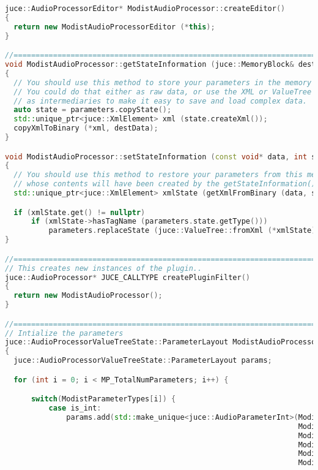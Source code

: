 \documentclass{article}
\begin{document}
\begin{appendix}
\begin{lstlisting}[language=C++]
juce::AudioProcessorEditor* ModistAudioProcessor::createEditor()
{
  return new ModistAudioProcessorEditor (*this);
}

//==============================================================================
void ModistAudioProcessor::getStateInformation (juce::MemoryBlock& destData)
{
  // You should use this method to store your parameters in the memory block.
  // You could do that either as raw data, or use the XML or ValueTree classes
  // as intermediaries to make it easy to save and load complex data.
  auto state = parameters.copyState();
  std::unique_ptr<juce::XmlElement> xml (state.createXml());
  copyXmlToBinary (*xml, destData);
}

void ModistAudioProcessor::setStateInformation (const void* data, int sizeInBytes)
{
  // You should use this method to restore your parameters from this memory block,
  // whose contents will have been created by the getStateInformation() call.
  std::unique_ptr<juce::XmlElement> xmlState (getXmlFromBinary (data, sizeInBytes));

  if (xmlState.get() != nullptr)
      if (xmlState->hasTagName (parameters.state.getType()))
          parameters.replaceState (juce::ValueTree::fromXml (*xmlState));
}

//==============================================================================
// This creates new instances of the plugin..
juce::AudioProcessor* JUCE_CALLTYPE createPluginFilter()
{
  return new ModistAudioProcessor();
}

//==============================================================================
// Intialize the parameters
juce::AudioProcessorValueTreeState::ParameterLayout ModistAudioProcessor::createParameterLayout()
{
  juce::AudioProcessorValueTreeState::ParameterLayout params;

  for (int i = 0; i < MP_TotalNumParameters; i++) {

      switch(ModistParameterTypes[i]) {
          case is_int:
              params.add(std::make_unique<juce::AudioParameterInt>(ModistParameterID[i],
                                                                   ModistParameterID[i],
                                                                   ModistParameterMin[i],
                                                                   ModistParameterMax[i],
                                                                   ModistParameterDefault[i],
                                                                   ModistParameterID[i]));


\end{lstlisting}
\end{appendix}
\end{document}
